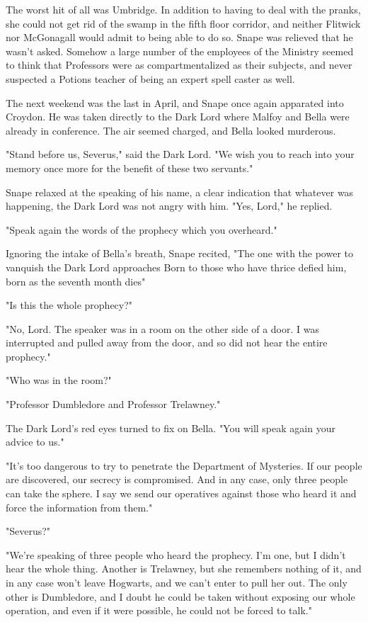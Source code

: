 The worst hit of all was Umbridge. In addition to having to deal with the pranks, she could not get rid of the swamp in the fifth floor corridor, and neither Flitwick nor McGonagall would admit to being able to do so. Snape was relieved that he wasn't asked. Somehow a large number of the employees of the Ministry seemed to think that Professors were as compartmentalized as their subjects, and never suspected a Potions teacher of being an expert spell caster as well.

The next weekend was the last in April, and Snape once again apparated into Croydon. He was taken directly to the Dark Lord where Malfoy and Bella were already in conference. The air seemed charged, and Bella looked murderous.

"Stand before us, Severus," said the Dark Lord. "We wish you to reach into your memory once more for the benefit of these two servants."

Snape relaxed at the speaking of his name, a clear indication that whatever was happening, the Dark Lord was not angry with him. "Yes, Lord," he replied.

"Speak again the words of the prophecy which you overheard."

Ignoring the intake of Bella's breath, Snape recited, "The one with the power to vanquish the Dark Lord approaches{\el} Born to those who have thrice defied him, born as the seventh month dies{\el}"

"Is this the whole prophecy?"

"No, Lord. The speaker was in a room on the other side of a door. I was interrupted and pulled away from the door, and so did not hear the entire prophecy."

"Who was in the room?"

"Professor Dumbledore and Professor Trelawney."

The Dark Lord's red eyes turned to fix on Bella. "You will speak again your advice to us."

"It's too dangerous to try to penetrate the Department of Mysteries. If our people are discovered, our secrecy is compromised. And in any case, only three people can take the sphere. I say we send our operatives against those who heard it and force the information from them."

"Severus?"

"We're speaking of three people who heard the prophecy. I'm one, but I didn't hear the whole thing. Another is Trelawney, but she remembers nothing of it, and in any case won't leave Hogwarts, and we can't enter to pull her out. The only other is Dumbledore, and I doubt he could be taken without exposing our whole operation, and even if it were possible, he could not be forced to talk."

